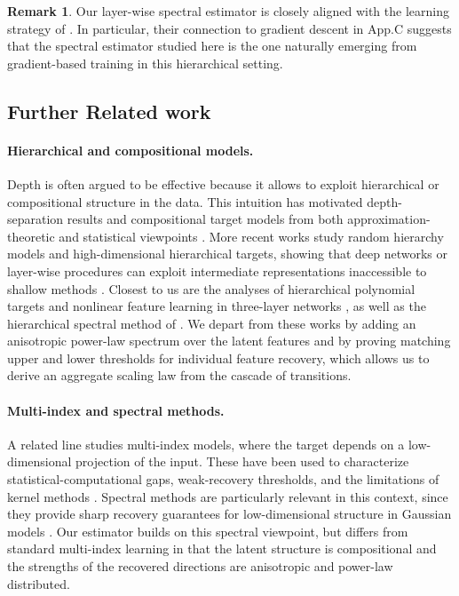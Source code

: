 \documentclass[]{article}
\numberwithin{equation}{section}
\theoremstyle{definition}
\newtheorem{remark}{Remark}[section]
\begin{document}
\begin{remark}
Our layer-wise spectral estimator is closely aligned with the learning strategy of \citep{tabanelli2026deep}. In particular, their connection to gradient descent in App.C suggests that the spectral estimator studied here is the one naturally emerging from gradient-based training in this hierarchical setting.
\end{remark}

\subsection{Further Related work}\label{subsec:related_works}

\paragraph{Hierarchical and compositional models.}
Depth is often argued to be effective because it allows to exploit hierarchical or compositional structure in the data. This intuition has motivated depth-separation results and compositional target models from both approximation-theoretic and statistical viewpoints \citep{pmlr-v49-telgarsky16,mhaskar2017and,poggio2017and,daniely2017depth,mossel2016deep}. More recent works study random hierarchy models and high-dimensional hierarchical targets, showing that deep networks or layer-wise procedures can exploit intermediate representations inaccessible to shallow methods \citep{garnierbrun2025transformerslearnstructureddata,cagnetta2024how,dandi2025computational}. Closest to us are the analyses of hierarchical polynomial targets and nonlinear feature learning in three-layer networks \citep{wang2023learning,nichani2024provable,fu2025learning}, as well as the hierarchical spectral method of \citep{tabanelli2026deep}. We depart from these works by adding an anisotropic power-law spectrum over the latent features and by proving matching upper and lower thresholds for individual feature recovery, which allows us to derive an aggregate scaling law from the cascade of transitions.

\paragraph{Multi-index and spectral methods.}
A  related line studies multi-index models, where the target depends on a low-dimensional projection of the input. These have been used to characterize statistical-computational gaps, weak-recovery thresholds, and the limitations of kernel methods \citep{aubin2018committee,barbier2019optimal,BenArous2021,abbe2022merged,bietti2022learning,troiani2024fundamental,damian2024computational}. Spectral methods are particularly relevant in this context, since they provide sharp recovery guarantees for low-dimensional structure in Gaussian models \citep{lu2020phase,mondelli2018fundamental,maillard2022construction,kovavcevic2025spectral,defilippis2025optimal}. Our estimator builds on this spectral viewpoint, but differs from standard multi-index learning in that the latent structure is compositional and the strengths of the recovered directions are anisotropic and power-law distributed.
\end{document}
